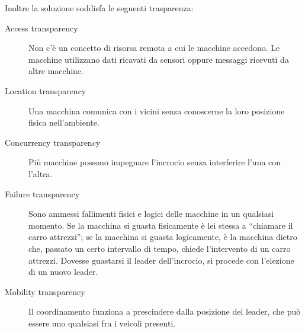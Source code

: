 \documentclass{memoir}
\begin{document}
Inoltre la soluzione soddisfa le seguenti trasparenza:
\begin{description}
\item[Access transparency] Non c'è un concetto di risorsa remota a cui le
  macchine accedono. Le macchine utilizzano dati ricavati da sensori oppure
  messaggi ricevuti da altre macchine.
\item[Location transparency] Una macchina comunica con i vicini senza conoscerne
  la loro posizione fisica nell'ambiente.
\item[Concurrency transparency] Più macchine possono impegnare l'incrocio senza
  interferire l'una con l'altra.
\item[Failure transparency] Sono ammessi fallimenti fisici e logici delle
  macchine in un qualsiasi momento. Se la macchina si guasta fisicamente è lei
  stessa a ``chiamare il carro attrezzi''; se la macchina si guasta logicamente,
  è la macchina dietro che, passato un certo intervallo di tempo, chiede
  l'intervento di un carro attrezzi. Dovesse guastarsi il leader dell'incrocio,
  si procede con l'elezione di un nuovo leader.
\item[Mobility transparency] Il coordinamento funziona a prescindere dalla
  posizione del leader, che può essere uno qualsiasi fra i veicoli presenti.
\end{description}
\end{document}
